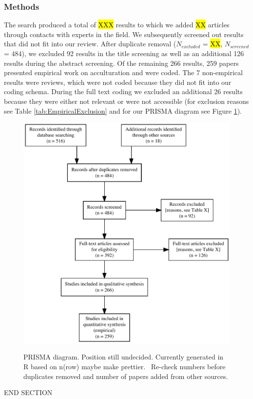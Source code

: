 \subsubsection{Methods}

The search produced a total of \hl{XXX} results to which we added
\hl{XX} articles through contacts with experts in the field. We
subsequently screened out results that did not fit into our review.
After duplicate removal (\(N_{excluded}\) = \hl{XX}, \(N_{screened}\) =
484), we excluded 92 results in the title screening as well as an
additional 126 results during the abstract screening. Of the remaining
266 results, 259 papers presented empirical work on acculturation and
were coded. The 7 non-empirical results were reviews, which were not
coded because they did not fit into our coding schema. During the full
text coding we excluded an additional 26 results because they were
either not relevant or were not accessible (for exclusion reasons see
Table \ref{tab:EmpiricalExclusion} and for our PRISMA diagram see Figure
\ref{fig:PRISMA}).

\begin{figure}[h]
\centering
\caption{PRISMA diagram. Position still undecided. Currently generated in R based on n(row) maybe make prettier. \Warning\ Re-check numbers before duplicates removed and number of papers added from other sources.}
\includegraphics[width=\textwidth]{Figures/PRISMA}
\label{fig:PRISMA}
\end{figure}



END SECTION

